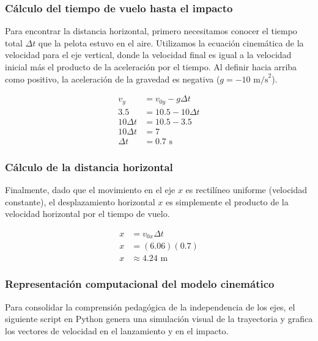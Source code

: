\documentclass[12pt, a4paper]{article}
\begin{document}
\subsubsection*{Cálculo del tiempo de vuelo hasta el impacto}

Para encontrar la distancia horizontal, primero necesitamos conocer el tiempo total $\Delta t$ que la pelota estuvo en el aire. Utilizamos la ecuación cinemática de la velocidad para el eje vertical, donde la velocidad final es igual a la velocidad inicial más el producto de la aceleración por el tiempo. Al definir hacia arriba como positivo, la aceleración de la gravedad es negativa ($g = -10 \text{ m/s}^2$).

\begin{align*}
v_y &= v_{0y} - g \Delta t \\
3.5 &= 10.5 - 10 \Delta t \\
10 \Delta t &= 10.5 - 3.5 \\
10 \Delta t &= 7 \\
\Delta t &= 0.7 \text{ s}
\end{align*}

\subsubsection*{Cálculo de la distancia horizontal}

Finalmente, dado que el movimiento en el eje $x$ es rectilíneo uniforme (velocidad constante), el desplazamiento horizontal $x$ es simplemente el producto de la velocidad horizontal por el tiempo de vuelo.

\begin{align*}
x &= v_{0x} \Delta t \\
x &= (6.06)(0.7) \\
x &\approx 4.24 \text{ m}
\end{align*}

\subsubsection*{Representación computacional del modelo cinemático}

Para consolidar la comprensión pedagógica de la independencia de los ejes, el siguiente script en Python genera una simulación visual de la trayectoria y grafica los vectores de velocidad en el lanzamiento y en el impacto.
\end{document}
